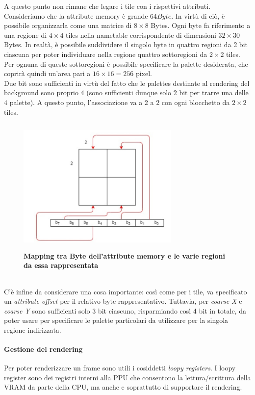 \documentclass[11pt]{article}
\begin{document}
A questo punto non rimane che legare i tile con i rispettivi attributi. Consideriamo che la attribute memory è grande $64 Byte$. In virtù di ciò, è possibile organizzarla come una matrice di $8\times8$ Bytes. Ogni byte fa riferimento a una regione di $4\times4$ tiles nella nametable corrispondente di dimensioni $32\times 30$ Bytes. In realtà, è possibile suddividere il singolo byte in quattro regioni da 2 bit ciascuna per poter individuare nella regione quattro sottoregioni da $2\times 2$ tiles. Per ognuna di queste sottoregioni è possibile specificare la palette desiderata, che coprirà quindi un'area pari a $16\times 16=256$ pixel.\\
Due bit sono sufficienti in virtù del fatto che le palettes destinate al rendering del background sono proprio 4 (sono sufficienti dunque solo 2 bit per trarre una delle 4 palette). A questo punto, l'associazione va a 2 a 2 con ogni blocchetto da $2\times 2$ tiles.
\begin{figure}[h]
\centering
\includegraphics[width=300px, height=255px]{ATT_TILE_MAP.jpg}\\
\small\textbf{Mapping tra Byte dell'attribute memory e le varie regioni da essa rappresentata}
\end{figure}\\
C'è infine da considerare una cosa importante: così come per i tile, va specificato un \emph{attribute offset} per il relativo byte rappresentativo. Tuttavia, per \emph{coarse X} e \emph{coarse Y} sono sufficienti solo 3 bit ciascuno, risparmiando così 4 bit in totale, da poter usare per specificare le palette particolari da utilizzare per la singola regione indirizzata.
\paragraph{Gestione del rendering}
Per poter renderizzare un frame sono utili i cosiddetti \emph{loopy registers}. I loopy register sono dei registri interni alla PPU che consentono la lettura/scrittura della VRAM da parte della CPU, ma anche e soprattutto di supportare il rendering.
\end{document}
